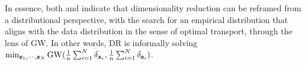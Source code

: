 

In essence, both  and  indicate that dimensionality reduction can be reframed from a distributional perspective, with the search for an empirical distribution that aligns with the data distribution in the sense of optimal transport, through the lens of GW. In other words, DR is informally solving $\min_{{\mathbf{z}}_1, \cdots, {\mathbf{z}}_N} \operatorname{GW}(\frac{1}{n} \sum_{i=1}^{N} \delta_{{\mathbf{x}}_i}, \frac{1}{n} \sum_{i=1}^{N} \delta_{{\mathbf{z}}_i})$.




